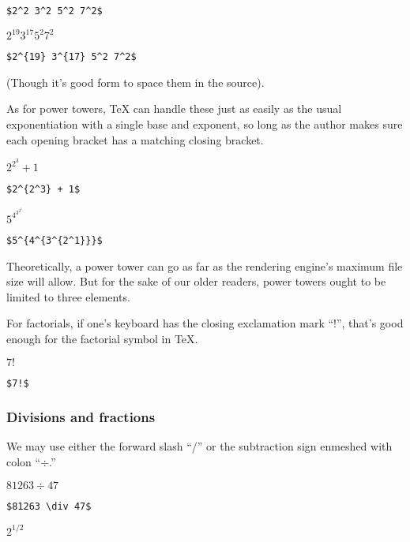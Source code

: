 \verb=$2^2 3^2 5^2 7^2$=

\medskip

$2^{19} 3^{17} 5^2 7^2$

\smallskip

\verb=$2^{19} 3^{17} 5^2 7^2$=

\bigskip

(Though it's good form to space them in the source).

As for power towers, \TeX{} can handle these just as easily as the usual exponentiation with a single base and exponent, so long as the author makes sure each opening bracket has a matching closing bracket.

\medskip

$2^{2^3} + 1$

\smallskip

\verb=$2^{2^3} + 1$=

\medskip

$5^{4^{3^{2^1}}}$

\smallskip

\verb=$5^{4^{3^{2^1}}}$=

\bigskip

Theoretically, a power tower can go as far as the rendering engine's maximum file size will allow. But for the sake of our older readers, power towers ought to be limited to three elements.

For factorials, if one's keyboard has the closing exclamation mark ``!'', that's good enough for the factorial symbol in \TeX{}.

\medskip

$7!$

\smallskip

\verb'$7!$'

\bigskip

\subsubsection{Divisions and fractions}

We may use either the forward slash ``/'' or the subtraction sign enmeshed with colon ``$\div$.''

\medskip

$81263 \div 47$

\smallskip

\verb=$81263 \div 47$=

\medskip

$2^{1/2}$

\smallskip

